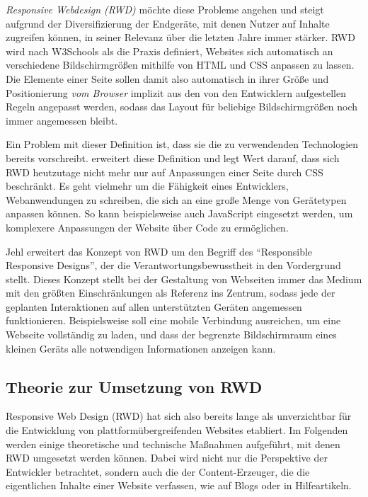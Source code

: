 \emph{Responsive Webdesign (RWD)} möchte diese Probleme angehen und steigt aufgrund der Diversifizierung der Endgeräte, mit denen Nutzer auf Inhalte zugreifen können, in seiner Relevanz über die letzten Jahre immer stärker.
RWD wird nach W3Schools \autocite{W3Schools.ResponsiveWebDesign.2024} als die Praxis definiert, Websites sich automatisch an verschiedene Bildschirmgrößen mithilfe von HTML und CSS anpassen zu lassen.
Die Elemente einer Seite sollen damit also automatisch in ihrer Größe und Positionierung \emph{vom Browser} implizit aus den von den Entwicklern aufgestellen Regeln angepasst werden, sodass das Layout für beliebige Bildschirmgrößen noch immer angemessen bleibt.

Ein Problem mit dieser Definition ist, dass sie die zu verwendenden Technologien bereits vorschreibt.
\autocite[S. 28]{Laati.ImplementingResponsiveDesignInIndustrialDashboardEditor.2017} erweitert diese Definition und legt Wert darauf, dass sich RWD heutzutage nicht mehr nur auf Anpassungen einer Seite durch CSS beschränkt.
Es geht vielmehr um die Fähigkeit eines Entwicklers, Webanwendungen zu schreiben, die sich an eine große Menge von Gerätetypen anpassen können.
So kann beispielsweise auch JavaScript eingesetzt werden, um komplexere Anpassungen der Website über Code zu ermöglichen.

Jehl \autocite{Jehl.ResponsibleResponsiveWebDesign.2014} erweitert das Konzept von RWD um den Begriff des "`Responsible Responsive Designs"', der die Verantwortungsbewusstheit in den Vordergrund stellt.
Dieses Konzept stellt bei der Gestaltung von Webseiten immer das Medium mit den größten Einschränkungen als Referenz ins Zentrum, sodass jede der geplanten Interaktionen auf allen unterstützten Geräten angemessen funktionieren.
Beispielsweise soll eine mobile Verbindung ausreichen, um eine Webseite vollständig zu laden, und dass der begrenzte Bildschirmraum eines kleinen Geräts alle notwendigen Informationen anzeigen kann.


\subsection{Theorie zur Umsetzung von RWD}

Responsive Web Design (RWD) hat sich also bereits lange als unverzichtbar für die Entwicklung von plattformübergreifenden Websites etabliert.
Im Folgenden werden einige theoretische und technische Maßnahmen aufgeführt, mit denen RWD umgesetzt werden können.
Dabei wird nicht nur die Perspektive der Entwickler betrachtet, sondern auch die der Content-Erzeuger, die die eigentlichen Inhalte einer Website verfassen, wie auf Blogs oder in Hilfeartikeln.

